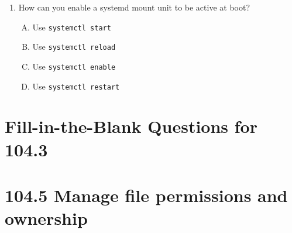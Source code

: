 \documentclass[a4paper]{report}
\begin{document}
\begin{enumerate}[1.]
    \item How can you enable a systemd mount unit to be active at boot?  
    \begin{enumerate}[A)]
        \item Use \texttt{systemctl start}  
        \item Use \texttt{systemctl reload}  
        \item Use \texttt{systemctl enable}  
        \item Use \texttt{systemctl restart}  
    \end{enumerate}

\end{enumerate}

\newpage
\section*{Fill-in-the-Blank Questions for 104.3}

\newpage
\section*{104.5 Manage file permissions and ownership}

\newpage
\end{document}
